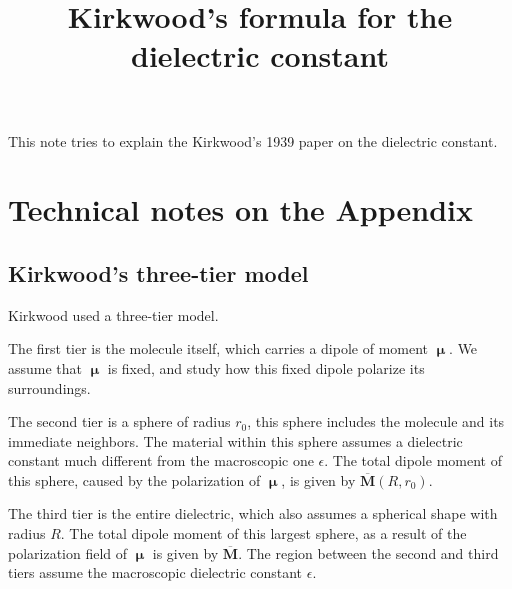 \documentclass[11pt]{article}
\newcommand{\vct}[1]{\boldsymbol{\mathbf{#1}}}
\newcommand{\vMbar}{\overline{\vct{M}}}
\newcommand{\vmu}{\vct{\upmu}}
\begin{document}
\title{Kirkwood's formula for the dielectric constant}
\author{ \vspace{-10ex} }
\date{ \vspace{-10ex} }
\maketitle


This note tries to explain the Kirkwood's 1939 paper\cite{kirkwood1939a}
on the dielectric constant.
%




\section{Technical notes on the Appendix}



\subsection{Kirkwood's three-tier model}



Kirkwood used a three-tier model.


The first tier is the molecule itself,
which carries a dipole of moment $\vmu$.
%
We assume that $\vmu$ is fixed,
and study how this fixed dipole polarize its surroundings.


The second tier is a sphere of radius $r_0$,
this sphere includes the molecule and its immediate neighbors.
%
The material within this sphere assumes a dielectric constant
much different from the macroscopic one $\epsilon$.
%
The total dipole moment of this sphere,
caused by the polarization of $\vmu$,
is given by $\vMbar(R, r_0)$.


The third tier is the entire dielectric,
which also assumes a spherical shape with radius $R$.
%
The total dipole moment of this largest sphere,
as a result of the polarization field of $\vmu$
is given by $\vMbar$.
%
The region between the second and third tiers
assume the macroscopic dielectric constant $\epsilon$.
\end{document}
